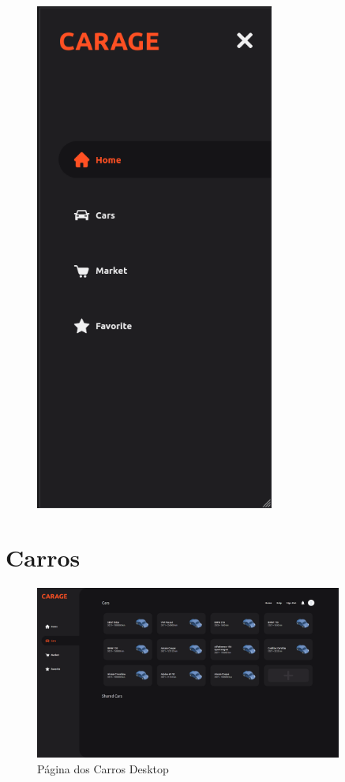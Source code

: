 \documentclass[a4paper]{report}
\begin{document}
\begin{figure}[H]
\begin{minipage}{.5\textwidth}
    \includegraphics[width=0.7\textwidth]{images/dashboard_mobile_navbar.png}
    \label{img:Frame40}
\end{minipage}%
\end{figure}

\pagebreak

\section{Carros}

\begin{figure}[H]
    \centering
    \includegraphics[width=0.9\textwidth]{images/cars.png}
    \caption{Página dos Carros Desktop}
\end{figure}
\end{document}
